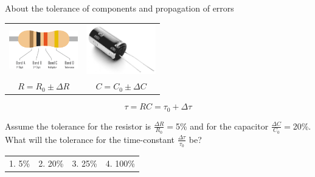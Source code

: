 \documentclass[presentation,aspectratio=169]{beamer}
\begin{document}
\begin{frame}[label={sec:orged6ff34}]{About the tolerance of components and propagation of errors}
\setlength{\tabcolsep}{1cm}

\begin{center}
\begin{tabular}{cc}
\includegraphics[width=3cm]{../../figures/resistor-color-code-4-band.png} & \includegraphics[width=3cm]{../../figures/capacitor.jpg}\\
\(R = R_0 \pm \Delta R\) & \(C = C_0 \pm \Delta C\)\\
\end{tabular}
\end{center}

\[\tau = RC = \tau_0 + \Delta\tau\]

\pause
Assume the tolerance for the resistor is \(\frac{\Delta R}{R_0}=\)5\% and for the capacitor \(\frac{\Delta C}{C_0}=\)20\%. What will the tolerance for the time-constant \(\frac{\Delta\tau}{\tau_0}\) be?
\setlength{\tabcolsep}{1cm}
\begin{center}
\begin{tabular}{cccc}
1. 5\% & 2. 20\% & 3. 25\% & 4. 100\%\\
\end{tabular}
\end{center}
\end{frame}
\end{document}
